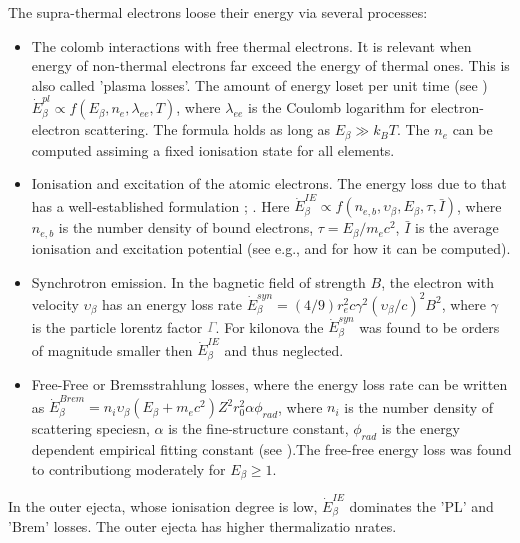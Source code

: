 \documentclass[11pt,a4paper,headinclude=true,DIV=14,BCOR=8mm,chapterprefix,listof=totoc,twoside,openright,abstracton]{scrbook}
\newcommand{\gray}[1]{\textcolor{gray}{#1}}
\begin{document}
The supra-thermal electrons loose their energy via several processes:
\begin{itemize}
    \item The colomb interactions with free thermal electrons. It is relevant when energy of non-thermal electrons far exceed the energy of thermal ones. This is also called 'plasma losses'. The amount of energy loset per unit time (see \cite{(Huba, J. D. 2013)}) $\dot{E}_{\beta}^{pl}\propto f(E_{\beta}, n_e, \lambda_{ee}, T)$, where $\lambda_{ee}$ is the Coulomb logarithm for electron-electron scattering. The formula holds as long as $E_{\beta}\gg k_{B}T$. The $n_e$ can be computed assiming a fixed ionisation state for all elements. 
    \item Ionisation and excitation of the atomic electrons. The energy loss due to that has a well-established formulation \cite{(Heitler 1954; Berger & Seltzer 1964; Gould 1975; Blumenthal & Gould 1970}; \cite{Chan & Lingenfelter (1993)} \cite{Milne et al. 1999)}. Here $\dot{E}_{\beta}^{IE} \propto f(n_{e,b}, \upsilon_{\beta}, E_{\beta}, \tau, \bar{I})$, where $n_{e,b}$ is the number density of bound electrons, $\tau=E_{\beta}/m_e c^2$, $\bar{I}$ is the average ionisation and excitation potential (see e.g., \cite{(Segre 1977)} and \cite{PChan & Lingenfelter (1993)} for how it can be computed). 
    \item Synchrotron emission. In the bagnetic field of strength $B$, the electron with velocity $\upsilon_{\beta}$ has an energy loss rate $\dot{E}_{\beta}^{syn}=(4/9)r_e^2 c \gamma^2 (\upsilon_{\beta}/c)^2 B^2$, where $\gamma$ is the particle lorentz factor \gray{$\Gamma$}. For kilonova the $\dot{E}_{\beta}^{syn}$ was found to be orders of magnitude smaller then $\dot{E}_{\beta}^{IE}$ and thus neglected. 
    \item Free-Free or Bremsstrahlung losses, where the energy loss rate can be written as $\dot{E}_{\beta}^{Brem} = n_i \upsilon_{\beta}(E_{\beta}+m_e c^2)Z^2 r_0^2 \alpha \phi_{rad}$, where $n_i$ is the number density of scattering speciesn, $\alpha$ is the fine-structure constant, $\phi_{rad}$ is the energy dependent empirical fitting constant (see \cite{Seltzer & Berger (1986)}).The free-free energy loss was found to contributiong moderately for $E_{\beta}\geq1$.
\end{itemize}

In the outer ejecta, whose ionisation degree is low, $\dot{E}_{\beta}^{IE}$ dominates the 'PL' and 'Brem' losses. The outer ejecta has higher thermalizatio nrates. 
\end{document}
